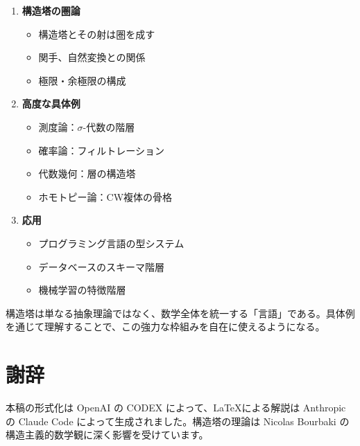 \documentclass[a4paper,11pt,ja=standard]{bxjsarticle}
\theoremstyle{definition}
\begin{document}
\begin{enumerate}
    \item \textbf{構造塔の圏論}
    \begin{itemize}
        \item 構造塔とその射は圏を成す
        \item 関手、自然変換との関係
        \item 極限・余極限の構成
    \end{itemize}

    \item \textbf{高度な具体例}
    \begin{itemize}
        \item 測度論：$\sigma$-代数の階層
        \item 確率論：フィルトレーション
        \item 代数幾何：層の構造塔
        \item ホモトピー論：CW複体の骨格
    \end{itemize}

    \item \textbf{応用}
    \begin{itemize}
        \item プログラミング言語の型システム
        \item データベースのスキーマ階層
        \item 機械学習の特徴階層
    \end{itemize}
\end{enumerate}

\begin{keyidea}
構造塔は単なる抽象理論ではなく、数学全体を統一する「言語」である。具体例を通じて理解することで、この強力な枠組みを自在に使えるようになる。
\end{keyidea}

\section*{謝辞}

本稿の形式化は OpenAI の CODEX によって、\LaTeX による解説は Anthropic の Claude Code によって生成されました。構造塔の理論は Nicolas Bourbaki の構造主義的数学観に深く影響を受けています。
\end{document}
